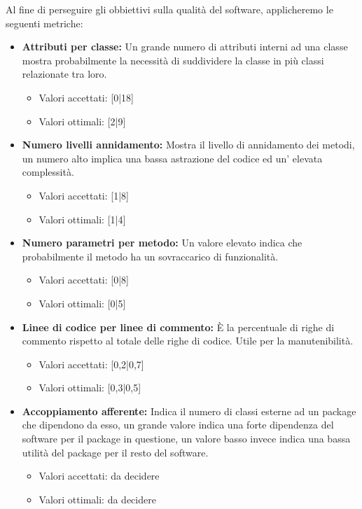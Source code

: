 \documentclass[a4paper]{article}
\begin{document}
				Al fine di perseguire gli obbiettivi sulla qualità del software, applicheremo le seguenti metriche:
				\begin{itemize}
					\item \textbf{Attributi per classe:}
						Un grande numero di attributi interni ad una classe mostra probabilmente la necessità di suddividere la classe 
						in più classi relazionate tra loro.
						\begin{itemize}
							\item Valori accettati: [0|18]
							\item Valori ottimali: [2|9]
						\end{itemize}

					\item \textbf{Numero livelli annidamento:}
						Mostra il livello di annidamento dei metodi, un numero alto implica una bassa astrazione del codice ed 
						un' elevata complessità.
						\begin{itemize}
							\item Valori accettati: [1|8]
							\item Valori ottimali: [1|4]
						\end{itemize}

					\item \textbf{Numero parametri per metodo:}
						Un valore elevato indica che probabilmente il metodo ha un sovraccarico di funzionalità.
						\begin{itemize}
							\item Valori accettati: [0|8]
							\item Valori ottimali: [0|5]
						\end{itemize}

					\item \textbf{Linee di codice per linee di commento:}
						È la percentuale di righe di commento rispetto al totale delle righe di codice. Utile per la manutenibilità.
						\begin{itemize}
							\item Valori accettati: [0,2|0,7]
							\item Valori ottimali: [0,3|0,5]
						\end{itemize}

					\item \textbf{Accoppiamento afferente:}
						Indica il numero di classi esterne ad un package che dipendono da esso, un grande valore indica una forte 
						dipendenza del software per il package in questione, un valore basso invece indica una bassa utilità del 
						package per il resto del software.
						\begin{itemize}
							\item Valori accettati: da decidere
							\item Valori ottimali: da decidere
						\end{itemize}


\end{itemize}
\end{document}
